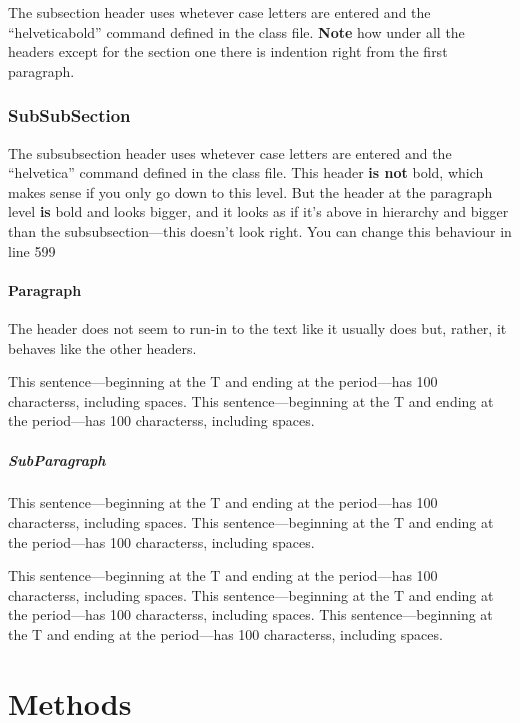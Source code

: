 \documentclass[utf8]{my_class_1_frontiers_vanc}  %
\begin{document}
The subsection header uses whetever case letters are entered and the ``helveticabold'' command
defined in the class file. \textbf{Note} how under all the headers except for the section one there
is indention right from the first paragraph.

\subsubsection{SubSubSection}%

The subsubsection header uses whetever case letters are entered and the ``helvetica'' command
defined in the class file. This header \textbf{is not} bold, which makes sense if you only go down
to this level. But the header at the paragraph level \textbf{is} bold and looks bigger, and it
looks as if it's above in hierarchy and bigger than the subsubsection---this doesn't look right.
You can change this behaviour in line 599

\paragraph{Paragraph} 

The header does not seem to run-in to the text like it usually does but, rather, it behaves like
the other headers.

This sentence---beginning at the T and ending at the period---has 100 characterss, including spaces. 
This sentence---beginning at the T and ending at the period---has 100 characterss, including spaces.

\subparagraph{SubParagraph} 

This sentence---beginning at the T and ending at the period---has 100 characterss, including spaces.
This sentence---beginning at the T and ending at the period---has 100 characterss, including spaces.

This sentence---beginning at the T and ending at the period---has 100 characterss, including spaces.
This sentence---beginning at the T and ending at the period---has 100 characterss, including spaces.
This sentence---beginning at the T and ending at the period---has 100 characterss, including spaces.


\section{Methods}\label{methods}
\end{document}
